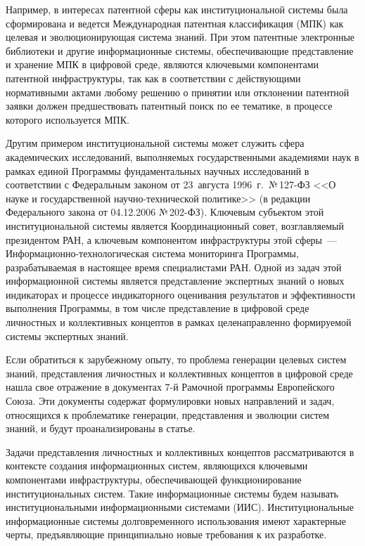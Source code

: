 \begin{multicols}{2}
   Например, в интересах патентной сферы как институциональной системы была
сформирована и ведется Международная патентная классификация (МПК) как целевая и
эволюционирующая сис\-те\-ма знаний. При этом патентные электронные библиотеки и другие
информационные системы, обеспечивающие представление и хранение МПК в цифровой
среде, являются ключевыми компонентами патентной инфраструктуры, так как в
соответствии с действующими нормативными актами любому решению о принятии или
отклонении патентной заявки должен предшествовать патентный поиск по ее тематике, в
процессе которого используется МПК.

   Другим примером институциональной системы может служить сфера академических
исследований, выполняемых государственными академиями наук в рамках единой
Программы фундаментальных научных исследований в соответствии с Федеральным
законом от 23~августа 1996~г.\ №\,127-ФЗ <<О науке и государственной
   научно-технической политике>> (в редакции Федерального закона от 04.12.2006
   №\,202-ФЗ). Ключевым субъектом этой институциональной системы является
Координационный совет, возглавляемый президентом РАН, а клю\-чевым компонентом
инфраструктуры этой сферы~--- Информационно-технологическая система мониторинга
Программы, разрабатываемая в настоящее время специалистами РАН. Одной из задач этой
информационной системы является пред\-став\-ле\-ние экспертных знаний о новых индикаторах
и процессе индикаторного оценивания результатов и эффективности выполнения
Программы, в том числе представление в цифровой среде личностных и коллективных
концептов в рамках целенаправленно формируемой системы экспертных знаний.
{

}

   Если обратиться к зарубежному опыту, то проблема генерации целевых систем знаний,
пред\-став\-ле\-ния личностных и коллективных концептов в цифровой среде нашла свое
отражение в документах 7-й Рамочной программы Европейского Союза. Эти документы
содержат формулировки новых направлений и задач, относящихся к проблематике
генерации, представления и эволюции систем знаний, и будут проанализированы в статье.

   Задачи представления личностных и коллективных концептов рассматриваются в
контексте %
создания информационных систем, являющихся ключевыми компонентами
инфраструктуры, обеспечивающей функционирование институциональных сис\-тем. Такие
информационные системы %
\mbox{будем} называть институциональными информационными
системами (ИИС). Институциональные инфор\-ма\-ци\-он\-ные
сис\-те\-мы долговременного использования имеют характерные черты,
предъявляющие принципиально новые требования к их раз\-ра\-ботке.
{

}
\end{multicols}
